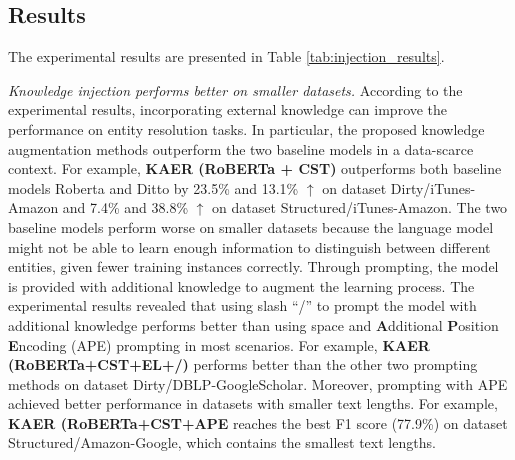 \subsection{Results}
The experimental results are presented in Table \ref{tab:injection_results}.


\textit{Knowledge injection performs better on smaller datasets.}
According to the experimental results, incorporating external knowledge can improve the performance on entity resolution tasks. In particular, the proposed knowledge augmentation methods outperform the two baseline models in a data-scarce context.
For example, \textbf{KAER (RoBERTa + CST)} outperforms both baseline models Roberta and Ditto by 23.5\% and 13.1\% $\uparrow$ on dataset Dirty/iTunes-Amazon and 7.4\% and 38.8\% $\uparrow$ on dataset Structured/iTunes-Amazon. The two baseline models perform worse on smaller datasets because the language model might not be able to learn enough information to distinguish between different entities, given fewer training instances correctly. 
Through prompting, the model is provided with additional knowledge to augment the learning process. The experimental results revealed that using slash ``/'' to prompt the model with additional knowledge performs better than using space and \textbf{A}dditional \textbf{P}osition \textbf{E}ncoding (APE) prompting in most scenarios. For example, \textbf{KAER (RoBERTa+CST+EL+/)} performs better than the other two prompting methods 
on dataset Dirty/DBLP-GoogleScholar. Moreover, prompting with APE achieved better performance in datasets with smaller text lengths. For example, \textbf{KAER (RoBERTa+CST+APE} reaches the best F1 score (77.9\%) on dataset Structured/Amazon-Google, which contains the smallest text lengths.  


